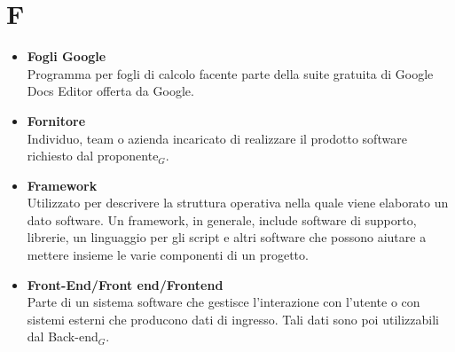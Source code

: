 \chapter{F} \label{F}
\begin{itemize}	
	\item \textbf{Fogli Google}\\
	Programma per fogli di calcolo facente parte della suite gratuita di Google Docs Editor offerta da Google.
		
	\item \textbf{Fornitore}\\
	Individuo, team o azienda incaricato di realizzare  il prodotto software richiesto dal proponente$_G$.		
	
	\item \textbf{Framework} \\
	Utilizzato per descrivere la struttura operativa nella quale viene elaborato un dato software.
	Un framework, in generale, include software di supporto, librerie, un linguaggio per gli script e altri software che possono aiutare a mettere insieme le varie componenti di un progetto.
	
	\item \textbf{Front-End/Front end/Frontend} \\
	Parte di un sistema software che gestisce l'interazione con l'utente o con sistemi esterni che producono dati di ingresso.
	Tali dati sono poi utilizzabili dal Back-end$_G$.


\end{itemize}
